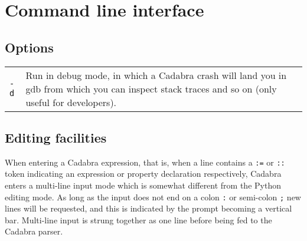 
\section{Command line interface}
\subsection{Options}

\begin{tabularx}{.8\textwidth}{lX}
\verb|-d| & Run in debug mode, in which a Cadabra crash will land you in gdb
            from which you can inspect stack traces and so on (only useful for
            developers).
\end{tabularx}



\subsection{Editing facilities}

When entering a Cadabra expression, that is, when a line contains a
\verb|:=| or \verb|::| token indicating an expression or property
declaration respectively, Cadabra enters a multi-line input mode which
is somewhat different from the Python editing mode. As long as the
input does not end on a colon \verb|:| or semi-colon \verb|;| new
lines will be requested, and this is indicated by the prompt becoming
a vertical bar. Multi-line input is strung together as one line before
being fed to the Cadabra parser.

